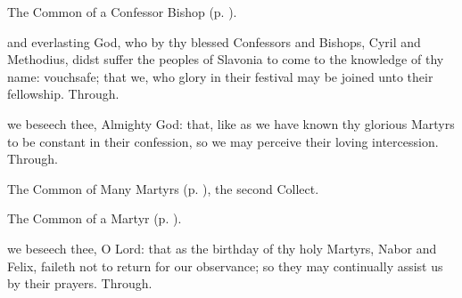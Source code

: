 
\clearpage
{}

\begin{rubric}
	The Common of a Confessor Bishop (p. \pageref{CommonConfessorBishop}).
\end{rubric}

{} and everlasting God, who by thy blessed Confessors and Bishops, Cyril and Methodius, didst suffer the peoples of Slavonia to come to the knowledge of thy name: vouchsafe; that we, who glory in their festival may be joined unto their fellowship. Through.



\memorialCollect
{} we beseech thee, Almighty God: that, like as we have known thy glorious Martyrs to be constant in their confession, so we may perceive their loving intercession. Through.



\begin{rubric}
	The Common of Many Martyrs (p. \pageref{CommonMartyrsNotBishopsCollect}), the second Collect.
\end{rubric}



\begin{rubric}
	The Common of a Martyr (p. \pageref{CommonMartyrBishopCollect}).
\end{rubric}



\memorialCollect
{} we beseech thee, O Lord: that as the birthday of thy holy Martyrs, Nabor and Felix, faileth not to return for our observance; so they may continually assist us by their prayers. Through.



